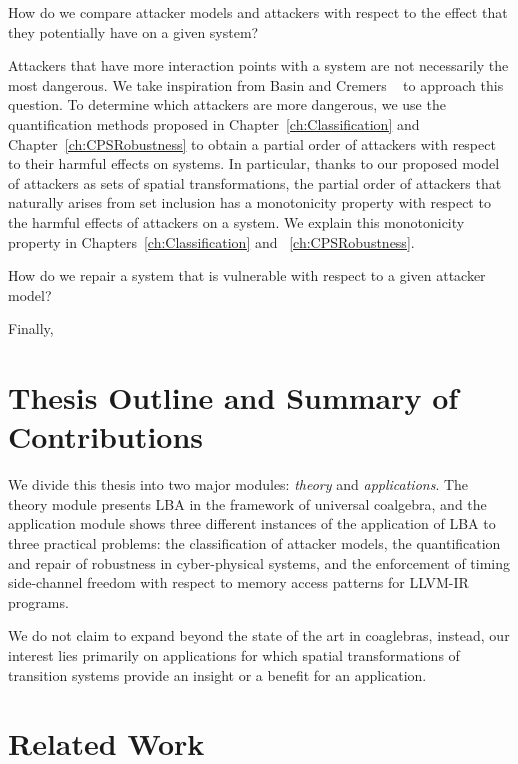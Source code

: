 \begin{question}
\label{que:Classification}
How do we compare attacker models and attackers with respect to the effect that they potentially have on a given system?
\end{question}
Attackers that have more interaction points with a system are not necessarily the most dangerous. We take inspiration from Basin and Cremers ~\cite{KnowYourEnemy} to approach this question. To determine which attackers are more dangerous, we use the quantification methods proposed in Chapter~\ref{ch:Classification} and Chapter~\ref{ch:CPSRobustness} to obtain a partial order of attackers with respect to their harmful effects on systems. In particular, thanks to our proposed model of attackers as sets of spatial transformations, the partial order of attackers that naturally arises from set inclusion has a monotonicity property with respect to the harmful effects of attackers on a system. We explain this monotonicity property in Chapters~\ref{ch:Classification} and ~\ref{ch:CPSRobustness}.
\begin{question}
\label{que:Repair}
How do we repair a system that is vulnerable with respect to a given attacker model?
\end{question}
Finally, 
 
\section{Thesis Outline and Summary of Contributions}
We divide this thesis into two major modules: \emph{theory} and \emph{applications}. The theory module presents LBA in the framework of universal coalgebra, and the application module shows three different instances of the application of LBA to three practical problems: the classification of attacker models, the quantification and repair of robustness in cyber-physical systems, and the enforcement of timing side-channel freedom with respect to memory access patterns for LLVM-IR programs.
 
We do not claim to expand beyond the state of the art in coaglebras, instead, our interest lies primarily on applications for which spatial transformations of transition systems provide an insight or a benefit for an application. 
\section{Related Work}

